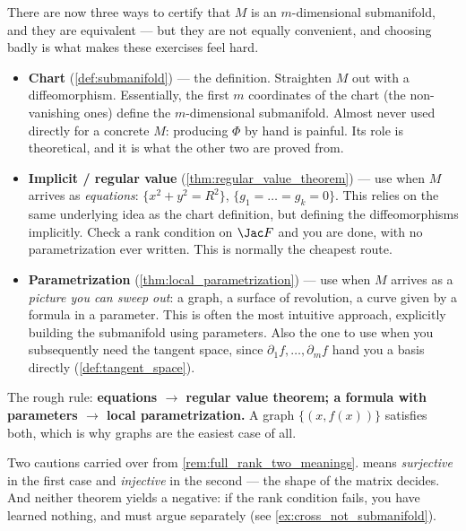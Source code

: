 \begin{remark}
\label{rem:three_submanifold_descriptions}
There are now three ways to certify that $M$ is an $m$-dimensional submanifold, and they are
equivalent --- but they are not equally convenient, and choosing badly is what makes these
exercises feel hard.

\begin{itemize}
  \item \textbf{Chart} (\cref{def:submanifold}) --- the definition. Straighten $M$ out with a
    diffeomorphism. Essentially, the first $m$ coordinates of the chart (the non-vanishing ones) define the $m$-dimensional submanifold. Almost never used directly for a concrete $M$: producing $\Phi$ by hand is
    painful. Its role is theoretical, and it is what the other two are proved from.
  \item \textbf{Implicit / regular value} (\cref{thm:regular_value_theorem}) --- use when $M$
    arrives as \emph{equations}: $\{x^2+y^2=R^2\}$, $\{g_1=\dots=g_k=0\}$. This relies on the same underlying idea as the chart definition, but defining the diffeomorphisms implicitly. Check a rank
    condition on $\Jac F$ and you are done, with no parametrization ever written. This is
    normally the cheapest route.
  \item \textbf{Parametrization} (\cref{thm:local_parametrization}) --- use when $M$ arrives as
    a \emph{picture you can sweep out}: a graph, a surface of revolution, a curve given by a
    formula in a parameter. This is often the most intuitive approach, explicitly building the submanifold using parameters. Also the one to use when you subsequently need the tangent space,
    since $\partial_1f,\dots,\partial_mf$ hand you a basis directly
    (\cref{def:tangent_space}).
\end{itemize}

The rough rule: \textbf{equations $\to$ regular value theorem; a formula with parameters $\to$
local parametrization.} A graph $\{(x,f(x))\}$ satisfies both, which is why graphs are the
easiest case of all.

Two cautions carried over from \cref{rem:full_rank_two_meanings}.  means
\emph{surjective} in the first case and \emph{injective} in the second --- the shape of the
matrix decides. And neither theorem yields a negative: if the rank condition fails, you have
learned nothing, and must argue separately (see \cref{ex:cross_not_submanifold}).
\end{remark}

